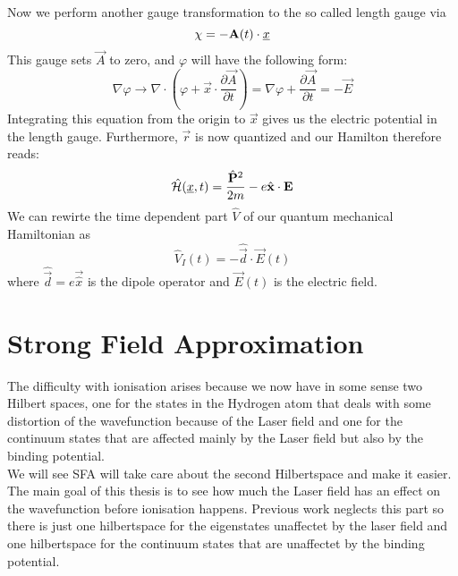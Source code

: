 Now we perform another gauge transformation to the so called length gauge via 
\begin{equation*}
    \chi = -\vec{A}(t)\cdot \uvec{x} %
\end{equation*}
This gauge sets $\vec{A}$ to zero, and $\varphi$ will have the following form:
\begin{equation*}
    \nabla \varphi \to \nabla \cdot (\varphi + \vec{x} \cdot \frac{\partial \vec{A}}{\partial t}) = \nabla \varphi + \frac{\partial \vec{A}}{\partial t} = - \vec{E}
\end{equation*}
Integrating this equation from the origin to $\vec{x}$ gives us the electric potential in the length gauge. Furthermore, $\vec{r}$ is now quantized and our Hamilton therefore reads:
\begin{equation*}
    \hat{\Hs}(\uvec{x}, t) = \frac{\hat{\vec{P}}^2}{2m} - e \hat{\vec{x}} \cdot \vec{E} %
\end{equation*}
We can rewirte the time dependent part $\hat{V}$ of our quantum mechanical Hamiltonian as
\begin{equation}
    \hat{V}_I(t) = -\hat{\vec{d}} \cdot \vec{E}(t) \label{eq:dipoleApprox}
\end{equation}
where $\hat{\vec{d}}=e\vec{\hat{x}}$ is the dipole operator and $\vec{E}(t)$ is the electric field.







\newpage
\section{Strong Field Approximation}
The difficulty with ionisation arises because we now have in some sense two Hilbert spaces, one for the states in the Hydrogen atom that deals with some distortion of the wavefunction because of the Laser field and one for the continuum states that are affected mainly by the Laser field but also by the binding potential.\\
We will see SFA will take care about the second Hilbertspace and make it easier. 
The main goal of this thesis is to see how much the Laser field has an effect on the wavefunction before ionisation happens. 
Previous work neglects this part so there is just one hilbertspace for the eigenstates unaffectet by the laser field and one hilbertspace for the continuum states that are unaffectet by the binding potential.



